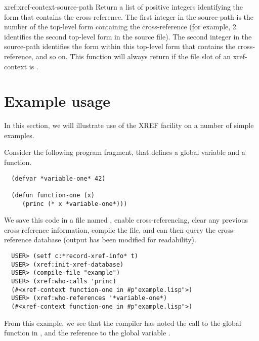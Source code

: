 \begin{defun}{xref:}{xref-context-source-path}{}
  Return a list of positive integers identifying the form that
  contains the cross-reference. The first integer in the source-path
  is the number of the top-level form containing the cross-reference
  (for example, 2 identifies the second top-level form in the source
  file). The second integer in the source-path identifies the form
  within this top-level form that contains the cross-reference, and so
  on. This function will always return \nil{} if the file slot of an
  xref-context is \nil{}.

\end{defun}




\section{Example usage}

In this section, we will illustrate use of the XREF facility on a
number of simple examples.

Consider the following program fragment, that defines a global
variable and a function.

\begin{verbatim}
  (defvar *variable-one* 42)
  
  (defun function-one (x)
     (princ (* x *variable-one*)))
\end{verbatim}

We save this code in a file named , enable
cross-referencing, clear any previous cross-reference information,
compile the file, and can then query the cross-reference database
(output has been modified for readability).

\begin{verbatim}
  USER> (setf c:*record-xref-info* t)
  USER> (xref:init-xref-database)
  USER> (compile-file "example")
  USER> (xref:who-calls 'princ)
  (#<xref-context function-one in #p"example.lisp">)
  USER> (xref:who-references '*variable-one*)
  (#<xref-context function-one in #p"example.lisp">)
\end{verbatim}

From this example, we see that the compiler has noted the call to the
global function  in , and the reference
to the global variable . 

